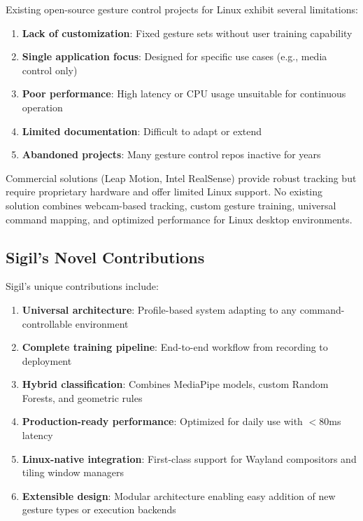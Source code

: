 \documentclass[11pt,a4paper]{article}
\begin{document}
Existing open-source gesture control projects for Linux exhibit several limitations:

\begin{enumerate}
\item \textbf{Lack of customization}: Fixed gesture sets without user training capability
\item \textbf{Single application focus}: Designed for specific use cases (e.g., media control only)
\item \textbf{Poor performance}: High latency or CPU usage unsuitable for continuous operation
\item \textbf{Limited documentation}: Difficult to adapt or extend
\item \textbf{Abandoned projects}: Many gesture control repos inactive for years
\end{enumerate}

Commercial solutions (Leap Motion, Intel RealSense) provide robust tracking but require proprietary hardware and offer limited Linux support. No existing solution combines webcam-based tracking, custom gesture training, universal command mapping, and optimized performance for Linux desktop environments.

\subsection{Sigil's Novel Contributions}

Sigil's unique contributions include:

\begin{enumerate}
\item \textbf{Universal architecture}: Profile-based system adapting to any command-controllable environment
\item \textbf{Complete training pipeline}: End-to-end workflow from recording to deployment
\item \textbf{Hybrid classification}: Combines MediaPipe models, custom Random Forests, and geometric rules
\item \textbf{Production-ready performance}: Optimized for daily use with $<$80ms latency
\item \textbf{Linux-native integration}: First-class support for Wayland compositors and tiling window managers
\item \textbf{Extensible design}: Modular architecture enabling easy addition of new gesture types or execution backends
\end{enumerate}
\end{document}
